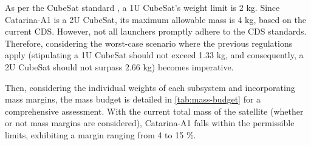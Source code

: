 As per the CubeSat standard \cite{cds}, a 1U CubeSat's weight limit is 2 kg. Since Catarina-A1 is a 2U CubeSat, its maximum allowable mass is 4 kg, based on the current \ac{CDS}. However, not all launchers promptly adhere to the \ac{CDS} standards. Therefore, considering the worst-case scenario where the previous regulations apply (stipulating a 1U CubeSat should not exceed 1.33 kg, and consequently, a 2U CubeSat should not surpass 2.66 kg) becomes imperative.

Then, considering the individual weights of each subsystem and incorporating mass margins, the mass budget is detailed in \autoref{tab:mass-budget} for a comprehensive assessment. With the current total mass of the satellite (whether or not mass margins are considered), Catarina-A1 falls within the permissible limits, exhibiting a margin ranging from 4 to 15 \%.

